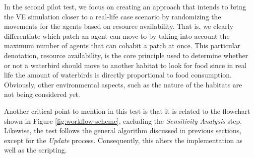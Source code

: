 In the second pilot test, we focus on creating an approach that intends to bring the VE simulation closer to a real-life case scenario by randomizing the movements for the agents based on resource availability. That is, we clearly differentiate which patch an agent can move to by taking into account the maximum number of agents that can cohabit a patch at once. This particular denotation, resource availability, is the core principle used to determine whether or not a waterbird should move to another habitat to look for food since in real life the amount of waterbirds is directly proportional to food consumption. Obviously, other environmental aspects, such as the nature of the habitats are not being considered yet.

Another critical point to mention in this test is that it is related to the flowchart shown in Figure \ref{fig:workflow-scheme}, excluding the \emph{Sensitivity Analysis} step. Likewise, the test follows the general algorithm discussed in previous sections, except for the \emph{Update} process. Consequently, this alters the implementation as well as the scripting.




